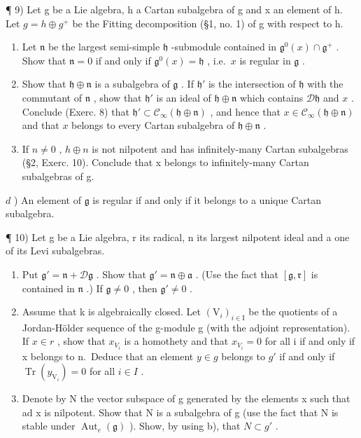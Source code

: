 ¶ 9) Let g be a Lie algebra, h a Cartan subalgebra of g and x an element of h. Let \(g = h \oplus g^{+}\) be the Fitting decomposition (§1, no. 1) of g with respect to h.

\begin{enumerate}
\def\labelenumi{\alph{enumi})}
\item
  Let \(\mathfrak{n}\) be the largest semi-simple \(\mathfrak{h}\) -submodule contained in \(\mathfrak{g}^0 (x)\cap \mathfrak{g}^+\) . Show that \(\mathfrak{n} = 0\) if and only if \(\mathfrak{g}^0 (x) = \mathfrak{h}\) , i.e.~\(x\) is regular in \(\mathfrak{g}\) .
\item
  Show that \(\mathfrak{h} \oplus \mathfrak{n}\) is a subalgebra of \(\mathfrak{g}\) . If \(\mathfrak{h}'\) is the intersection of \(\mathfrak{h}\) with the commutant of \(\mathfrak{n}\) , show that \(\mathfrak{h}'\) is an ideal of \(\mathfrak{h} \oplus \mathfrak{n}\) which contains \(\mathcal{D}\mathfrak{h}\) and \(x\) . Conclude (Exerc. 8) that \(\mathfrak{h}' \subset \mathcal{C}_{\infty}(\mathfrak{h} \oplus \mathfrak{n})\) , and hence that \(x \in \mathcal{C}_{\infty}(\mathfrak{h} \oplus \mathfrak{n})\) and that \(x\) belongs to every Cartan subalgebra of \(\mathfrak{h} \oplus \mathfrak{n}\) .
\item
  If \(n \neq 0\) , \(h \oplus n\) is not nilpotent and has infinitely-many Cartan subalgebras (§2, Exerc. 10). Conclude that x belongs to infinitely-many Cartan subalgebras of g.
\end{enumerate}

\(d\) ) An element of \(\mathfrak{g}\) is regular if and only if it belongs to a unique Cartan subalgebra.

¶ 10) Let g be a Lie algebra, r its radical, n its largest nilpotent ideal and a one of its Levi subalgebras.

\begin{enumerate}
\def\labelenumi{\alph{enumi})}
\item
  Put \(\mathfrak{g}' = \mathfrak{n} + \mathcal{D}\mathfrak{g}\) . Show that \(\mathfrak{g}' = \mathfrak{n} \oplus \mathfrak{a}\) . (Use the fact that \([\mathfrak{g}, \mathfrak{r}]\) is contained in \(\mathfrak{n}\) .) If \(\mathfrak{g} \neq 0\) , then \(\mathfrak{g}' \neq 0\) .
\item
  Assume that k is algebraically closed. Let \((\mathrm{V}_{i})_{i\in\mathrm{I}}\) be the quotients of a Jordan-Hölder sequence of the g-module g (with the adjoint representation). If \(x\in r\) , show that \(x_{V_{i}}\) is a homothety and that \(x_{V_{i}}=0\) for all i if and only if x belongs to n.~Deduce that an element \(y\in g\) belongs to \(g'\) if and only if \(\operatorname{Tr}(y_{\mathrm{V}_{i}})=0\) for all \(i\in I\) .
\item
  Denote by N the vector subspace of g generated by the elements x such that ad x is nilpotent. Show that N is a subalgebra of g (use the fact that N is stable under \(\operatorname{Aut}_{e}(\mathfrak{g})\) ). Show, by using b), that \(N \subset g'\) .
\end{enumerate}

